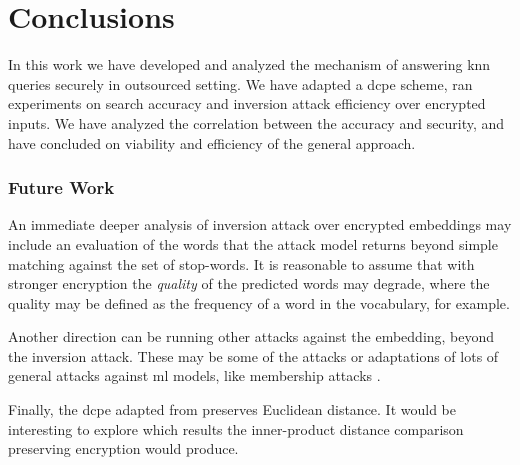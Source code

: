 	\section{Conclusions}

		In this work we have developed and analyzed the mechanism of answering \acrshort{knn} queries securely in outsourced setting.
		We have adapted a \acrshort{dcpe} scheme, ran experiments on search accuracy and inversion attack efficiency over encrypted inputs.
		We have analyzed the correlation between the accuracy and security, and have concluded on viability and efficiency of the general approach.

		\subsubsection{Future Work}

			An immediate deeper analysis of inversion attack over encrypted embeddings may include an evaluation of the words that the attack model returns beyond simple matching against the set of stop-words.
			It is reasonable to assume that with stronger encryption the \emph{quality} of the predicted words may degrade, where the quality may be defined as the frequency of a word in the vocabulary, for example.

			Another direction can be running other attacks against the embedding, beyond the inversion attack.
			These may be some of the \textcite{embedding-attacks} attacks or adaptations of lots of general attacks against \acrshort{ml} models, like membership attacks \cite{membership-attacks,enhanced-membership-attacks}.

			Finally, the \acrshort{dcpe} adapted from \cite{dcpe} preserves Euclidean distance.
			It would be interesting to explore which results the inner-product distance comparison preserving encryption would produce.
